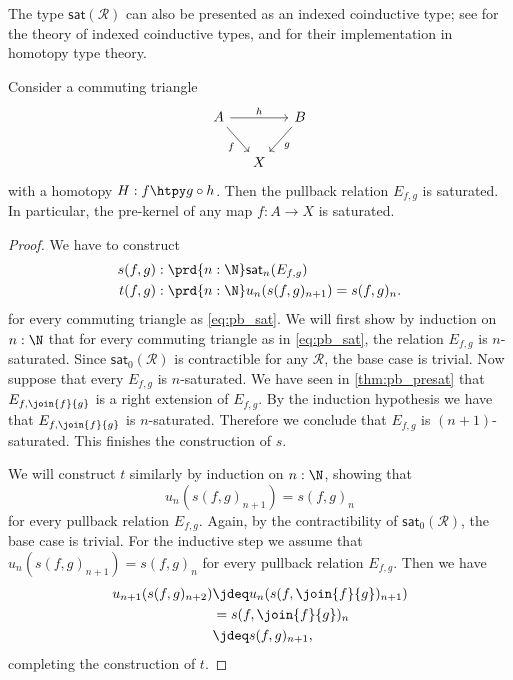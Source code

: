 \begin{rmk}
The type $\mathsf{sat}(\mathcal{R})$ can also be presented as an indexed coinductive type; see \cite{AltenkirchGhaniHancock} for the theory of indexed coinductive types, and \cite{AhrensCapriottiSpadotti} for their implementation in homotopy type theory. 
\end{rmk}

\begin{thm}\label{thm:pb_sat}
Consider a commuting triangle
\begin{equation}\label{eq:pb_sat}
\begin{tikzcd}[column sep=small]
A \arrow[rr,"h"] \arrow[dr,swap,"f"] & & B \arrow[dl,"g"] \\
& X
\end{tikzcd}
\end{equation}
with a homotopy $H:f\htpy g\circ h$. Then the pullback relation $E_{f,g}$ is saturated. In particular, the pre-kernel of any map $f:A\to X$ is saturated.
\end{thm}

\begin{proof}
We have to construct
\begin{align*}
s(f,g) & : \prd{n:\N} \mathsf{sat}_n(E_{f,g}) \\
t(f,g) & : \prd{n:\N} u_n(s(f,g)_{n+1})=s(f,g)_n. 
\end{align*}
for every commuting triangle as \cref{eq:pb_sat}. We will first show by induction on $n:\N$ that for every commuting triangle as in \cref{eq:pb_sat}, the relation $E_{f,g}$ is $n$-saturated. Since $\mathsf{sat}_0(\mathcal{R})$ is contractible for any $\mathcal{R}$, the base case is trivial.
Now suppose that every $E_{f,g}$ is $n$-saturated. We have seen in \cref{thm:pb_presat} that $E_{f,\join{f}{g}}$ is a right extension of $E_{f,g}$. By the induction hypothesis we have that $E_{f,\join{f}{g}}$ is $n$-saturated. Therefore we conclude that $E_{f,g}$ is $(n+1)$-saturated. This finishes the construction of $s$.

We will construct $t$ similarly by induction on $n:\N$, showing that 
\begin{equation*}
u_n(s(f,g)_{n+1})=s(f,g)_n
\end{equation*}
for every pullback relation $E_{f,g}$. Again, by the contractibility of $\mathsf{sat}_0(\mathcal{R})$, the base case is trivial. For the inductive step we assume that $u_n(s(f,g)_{n+1})=s(f,g)_n$ for every pullback relation $E_{f,g}$. Then we have
\begin{align*}
u_{n+1}(s(f,g)_{n+2}) & \jdeq u_n(s(f,\join{f}{g})_{n+1}) \\
& = s(f,\join{f}{g})_n \\
& \jdeq s(f,g)_{n+1},
\end{align*}
completing the construction of $t$. 
\end{proof}

